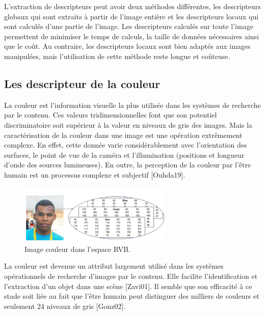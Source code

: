 L'extraction de descripteurs peut avoir deux méthodes différentes, les descripteurs globaux qui sont extraits à partir de l’image entière et les descripteurs locaux qui sont calculés d'une partie de l'image. Les descripteurs calculés sur toute l’image permettent de minimiser le temps de calculs, la taille de données nécessaires ainsi que le coût. Au contraire, les descripteurs locaux sont bien adaptés aux images manipulées, mais l’utilisation de cette méthode reste longue et coûteuse.

 
\subsection{Les descripteur de la couleur}
La couleur est l’information visuelle la plus utilisée dans les systèmes de recherche par le contenu. Ces valeurs tridimensionnelles font que son potentiel discriminatoire soit supérieur à la valeur en niveaux de gris des images. Mais la caractérisation de la couleur dans une image est une opération extrêmement complexe. En effet, cette donnée varie considérablement avec l’orientation des surfaces, le point de vue de la caméra et l’illumination (positions et longueur d'onde des sources lumineuses). En outre, la perception de la couleur par l'être humain est un processus complexe et subjectif [Ouhda19].

\begin{figure}[H]
	\label{fig:imageRVB}
	\centering
	\includegraphics[width=0.65\textwidth]{Figures/imageRVB} %
	
	\caption{Image couleur dans l’espace RVB.}
	
\end{figure}

La couleur est devenue un attribut largement utilisé dans les systèmes opérationnels de recherche d'images par le contenu. Elle facilite l'identification et l'extraction d'un objet dans une scène [Zavi01]. Il semble que son efficacité à ce stade soit liée au fait que l'être humain peut distinguer des milliers de couleurs et seulement 24 niveaux de gris [Gonz02].\\

